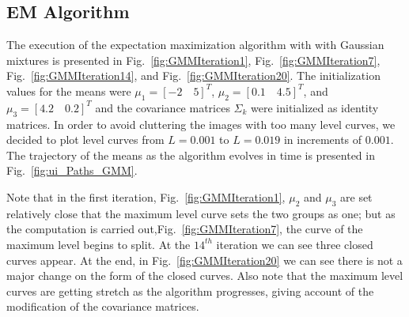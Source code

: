 \documentclass[letterpaper, 10 pt, conference]{ieeeconf}  %
\begin{document}
\subsection{EM Algorithm}
\label{sec:Experiment_EM_Algorithm}

The execution of the expectation maximization algorithm with with Gaussian mixtures is presented in Fig.~\ref{fig:GMMIteration1}, Fig.~\ref{fig:GMMIteration7}, Fig.~\ref{fig:GMMIteration14}, and  Fig.~\ref{fig:GMMIteration20}. The initialization values for the means were $\mu_{1} = [-2 \quad 5] ^T$, $\mu_{2} = [0.1 \quad 4.5] ^T$, and $\mu_{3} = [4.2 \quad 0.2] ^T$ and the covariance matrices $\Sigma_{k}$ were initialized as identity matrices.  In order to avoid cluttering the images with too many level curves, we decided to plot level curves from $L = 0.001$ to $L = 0.019$ in increments of $0.001$. The trajectory of the means as the algorithm evolves in time is presented in Fig.~\ref{fig:ui_Paths_GMM}.

 Note that in the first iteration, Fig.~\ref{fig:GMMIteration1}, $\mu_{2}$ and $\mu_{3}$ are set relatively close that the maximum level curve sets the two groups as
 one; but as the computation is carried out,Fig.~\ref{fig:GMMIteration7}, the curve of the maximum level begins to split. At the $14^{th}$ iteration we can see three closed curves appear. At the end, in Fig.~\ref{fig:GMMIteration20} we can see there is not a major change on the form of the closed curves. Also note that the maximum level curves are getting stretch as the algorithm progresses, giving account of the modification of the covariance matrices.
 
\end{document}
